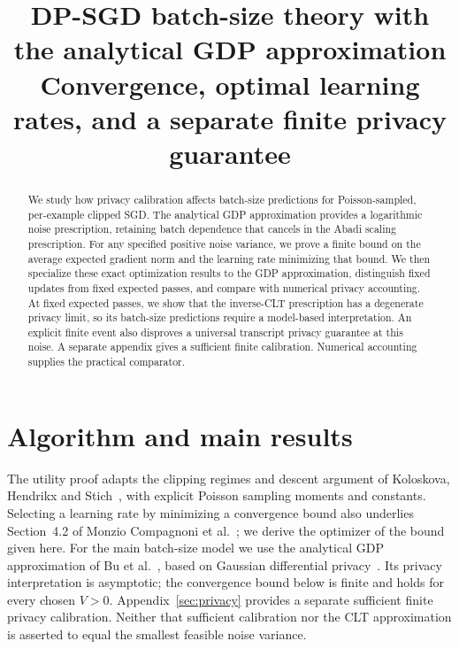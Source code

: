 \documentclass[11pt]{article}
\title{DP-SGD batch-size theory with the analytical GDP approximation\\
\large Convergence, optimal learning rates, and a separate finite privacy guarantee}
\author{}
\date{}
\begin{document}
\maketitle
\begin{abstract}
We study how privacy calibration affects batch-size predictions for
Poisson-sampled, per-example clipped SGD. The analytical GDP approximation
provides a logarithmic noise prescription, retaining batch dependence that
cancels in the Abadi scaling prescription. For any specified positive noise
variance, we prove a finite bound on the average expected gradient norm and
the learning rate minimizing that bound. We then specialize these exact
optimization results to the GDP approximation, distinguish fixed updates
from fixed expected passes, and compare with numerical privacy accounting.
At fixed expected passes, we show that the inverse-CLT prescription has a
degenerate privacy limit, so its batch-size predictions require a model-based
interpretation. An explicit finite event also disproves a universal transcript
privacy guarantee at this noise. A separate appendix gives a sufficient
finite calibration. Numerical accounting supplies the practical comparator.
\end{abstract}

\section{Algorithm and main results}
\label{sec:main}
The utility proof adapts the clipping regimes and descent argument of
Koloskova, Hendrikx and Stich~\cite[Appendices C.3--C.4]{clipping}, with
explicit Poisson sampling moments and constants. Selecting a learning rate
by minimizing a convergence bound also underlies Section~4.2 of Monzio
Compagnoni et al.~\cite{amap}; we derive the optimizer of the bound given here.
For the main batch-size model we use the analytical GDP approximation of
Bu et al.~\cite{bu2020deepgdp}, based on Gaussian differential
privacy~\cite{gdp}. Its privacy interpretation is asymptotic; the convergence
bound below is finite and holds for every chosen $V>0$.
Appendix~\ref{sec:privacy} provides a separate sufficient finite privacy
calibration. Neither that sufficient calibration nor the CLT approximation
is asserted to equal the smallest feasible noise variance.
\end{document}

